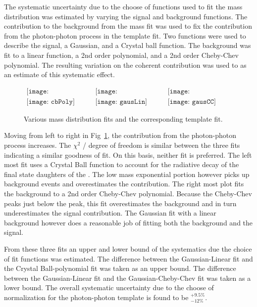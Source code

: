     The systematic uncertainty due to the choose of functions used to fit
      the mass distribution was estimated by varying the signal and 
      background functions.
    The contribution to the background from the mass fit was used to fix the
      contribution from the photon-photon process in the \pt{} template
      fit.
    Two functions were used to describe the signal, a Gaussian, and a Crystal
      ball function. 
    The background was fit to a linear function, a 2nd order polynomial, and
      a 2nd order Cheby-Chev polynomial. 
    The resulting variation on the coherent contribution was used to as an
      estimate of this systematic effect. 

    \begin{figure}[!Hhbt]
      \centering
      $ \begin{array}{ccc}
        \texttt{[image: cbPolyBkgEst]} &
        \texttt{[image: gausLinBkgEst]} &
        \texttt{[image: gausCCBkgEst]} \\
        \texttt{[image: cbPoly]} &
        \texttt{[image: gausLin]} &
        \texttt{[image: gausCC]}
      \end{array} $
      \caption{Various mass distribution fits and the corresponding \pt{}
        template fit.}
      \label{fig:massPtFitsForSyst}
    \end{figure}

    Moving from left to right in Fig~\ref{fig:massPtFitsForSyst}, the 
      contribution from the photon-photon process increases.
    The $\chi^{2}$ / degree of freedom is similar between the three 
      fits indicating a similar goodness of fit.
    On this basis, neither fit is preferred. 
    The left most fit uses a Crystal Ball function to account for the 
      radiative decay of the final state daughters of the \JPsi{}.
    The low mass exponential portion however picks up background events 
      and overestimates the \JPsi{} contribution. 
    The right most plot fits the background to a 2nd order Cheby-Chev 
      polynomial.
    Because the Cheby-Chev peaks just below the \JPsi{} peak, this fit 
      overestimates the background and in turn underestimates the signal 
      contribution.
    The Gaussian fit with a linear background however does a reasonable job
      of fitting both the background and the signal. 

    From these three fits an upper and lower bound of the systematics due
      the choice of fit functions was estimated. 
    The difference between the Gaussian-Linear fit and the 
      Crystal Ball-polynomial fit was taken as an upper bound. 
    The difference between the Gaussian-Linear fit and the 
        Gaussian-Cheby-Chev fit was taken as a lower bound. 
    The overall systematic uncertainty due to the choose of normalization for
      the photon-photon template is found to be $^{+9.5\%}_{-12\%}$.

